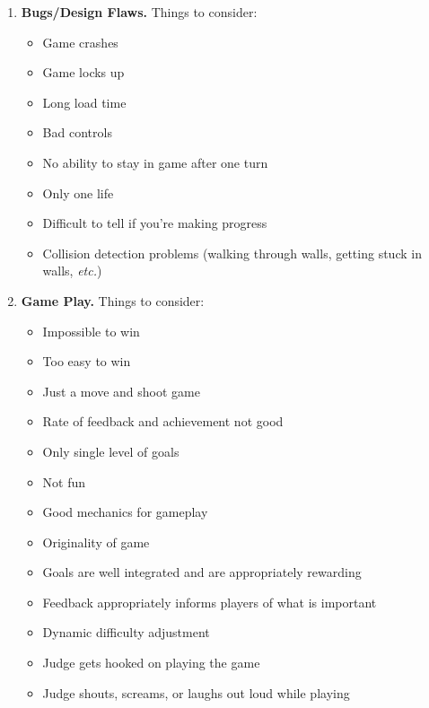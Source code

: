 \documentclass{article}
\begin{document}
\begin{enumerate}
\begin{enumerate}
\begin{itemize}
     \end{itemize}
  \item {\bf Bugs/Design Flaws.}
      Things to consider:
     \begin{itemize}
     \item Game crashes
     \item Game locks up
     \item Long load time
     \item Bad controls
     \item No ability to stay in game after one turn
     \item Only one life
     \item Difficult to tell if you're making progress
     \item Collision detection problems (walking through walls, getting
     stuck in walls, {\em etc.})
     \end{itemize}
  \item {\bf  Game Play.}
     Things to consider:
    \begin{itemize}
    \item Impossible to win
    \item Too easy to win
    \item Just a move and shoot game
    \item Rate of feedback and achievement not good
    \item Only single level of goals
    \item Not fun
    \item Good mechanics for gameplay
    \item Originality of game
    \item Goals are well integrated and are appropriately rewarding
    \item Feedback appropriately informs players of what is important
    \item Dynamic difficulty adjustment
    \item Judge gets hooked on playing the game
    \item Judge shouts, screams, or laughs out loud while playing
    \end{itemize}
      \end{enumerate}

  \end{enumerate}
\end{document}
